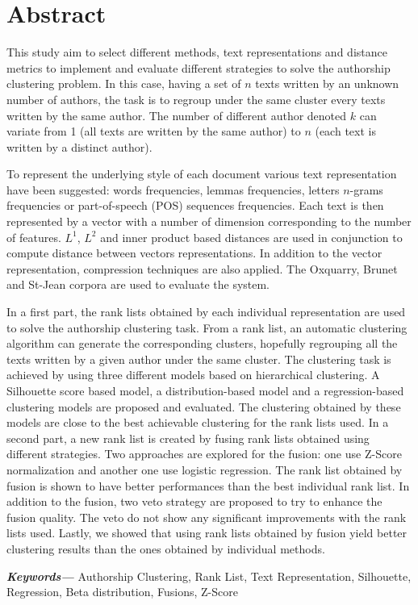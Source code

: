 \vspace*{\fill}
\chapter*{\centering Abstract}
This study aim to select different methods, text representations and distance metrics to implement and evaluate different strategies to solve the authorship clustering problem.
In this case, having a set of $n$ texts written by an unknown number of authors, the task is to regroup under the same cluster every texts written by the same author.
The number of different author denoted $k$ can variate from 1 (all texts are written by the same author) to $n$ (each text is written by a distinct author).

To represent the underlying style of each document various text representation have been suggested: words frequencies, lemmas frequencies, letters $n$-grams frequencies or part-of-speech (POS) sequences frequencies.
Each text is then represented by a vector with a number of dimension corresponding to the number of features.
$L^1$, $L^2$ and inner product based distances are used in conjunction to compute distance between vectors representations.
In addition to the vector representation, compression techniques are also applied.
The Oxquarry, Brunet and St-Jean corpora are used to evaluate the system.

In a first part, the rank lists obtained by each individual representation are used to solve the authorship clustering task.
From a rank list, an automatic clustering algorithm can generate the corresponding clusters, hopefully regrouping all the texts written by a given author under the same cluster.
The clustering task is achieved by using three different models based on hierarchical clustering.
A Silhouette score based model, a distribution-based model and a regression-based clustering models are proposed and evaluated.
The clustering obtained by these models are close to the best achievable clustering for the rank lists used.
In a second part, a new rank list is created by fusing rank lists obtained using different strategies.
Two approaches are explored for the fusion: one use Z-Score normalization and another one use logistic regression.
The rank list obtained by fusion is shown to have better performances than the best individual rank list.
In addition to the fusion, two veto strategy are proposed to try to enhance the fusion quality.
The veto do not show any significant improvements with the rank lists used.
Lastly, we showed that using rank lists obtained by fusion yield better clustering results than the ones obtained by individual methods.


{\small \textbf{\textit{Keywords---}} Authorship Clustering, Rank List, Text Representation, Silhouette, Regression, Beta distribution, Fusions, Z-Score}

\vspace*{\fill}

